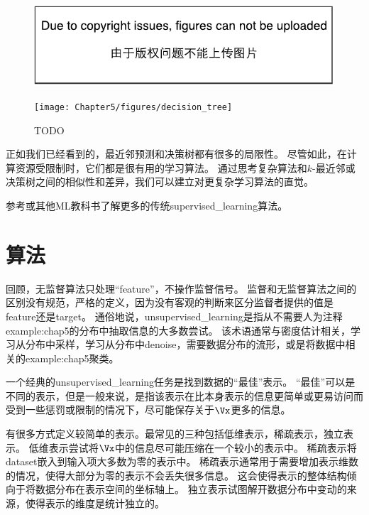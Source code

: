 \begin{figure}[!htb]
\ifOpenSource
\centerline{\includegraphics{figure.pdf}}
\else
\centerline{\texttt{[image: Chapter5/figures/decision\_tree]}}
\fi
\caption{TODO}
\label{fig:chap5_decision_tree}
\end{figure}

正如我们已经看到的，最近邻预测和决策树都有很多的局限性。
尽管如此，在计算资源受限制时，它们都是很有用的学习算法。
通过思考复杂算法和$k$-最近邻或决策树之间的相似性和差异，我们可以建立对更复杂学习算法的直觉。

参考\cite{MurphyBook2012,bishop-book2006,Hastie2001}或其他\gls{ML}教科书了解更多的传统\gls{supervised_learning}算法。

\section{算法}
\label{sec:unsupervised_learning_algorithms}
回顾，无监督算法只处理``\gls{feature}''，不操作监督信号。
监督和无监督算法之间的区别没有规范，严格的定义，因为没有客观的判断来区分监督者提供的值是\gls{feature}还是\gls{target}。
通俗地说，\gls{unsupervised_learning}是指从不需要人为注释\gls{example:chap5}的分布中抽取信息的大多数尝试。
该术语通常与密度估计相关，学习从分布中采样，学习从分布中\gls{denoise}，需要数据分布的流形，或是将数据中相关的\gls{example:chap5}聚类。

一个经典的\gls{unsupervised_learning}任务是找到数据的``最佳''表示。
``最佳''可以是不同的表示，但是一般来说，是指该表示在比本身表示的信息更简单或更易访问而受到一些惩罚或限制的情况下，尽可能保存关于$\Vx$更多的信息。 


有很多方式定义较简单的表示。最常见的三种包括低维表示，稀疏表示，独立表示。
低维表示尝试将$\Vx$中的信息尽可能压缩在一个较小的表示中。
稀疏表示将\gls{dataset}嵌入到输入项大多数为零的表示中\citep{Barlow89,Olshausen+Field-1996,Hinton+Ghahramani-97}。
稀疏表示通常用于需要增加表示维数的情况，使得大部分为零的表示不会丢失很多信息。
这会使得表示的整体结构倾向于将数据分布在表示空间的坐标轴上。
独立表示试图解开数据分布中变动的来源，使得表示的维度是统计独立的。

